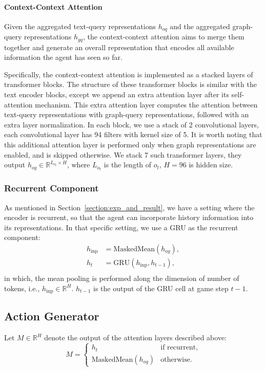 \documentclass[11pt]{article}
\begin{document}
\paragraph{Context-Context Attention}
Given the aggregated text-query representations $h_{oq}$ and the aggregated graph-query representations $h_{gq}$, the context-context attention aims to merge them together and generate an overall representation that encodes all available information the agent has seen so far.

Specifically, the context-context attention is implemented as a stacked layers of transformer blocks.
The structure of these transformer blocks is similar with the text encoder blocks, except we append an extra attention layer after its self-attention mechanism.
This extra attention layer computes the attention between text-query representations with graph-query representations, followed with an extra layer normalization.
In each block, we use a stack of 2 convolutional layers, each convolutional layer has 94 filters with kernel size of 5.
It is worth noting that this additional attention layer is performed only when graph representations are enabled, and is skipped otherwise.
We stack 7 such transformer layers, they output $h_{og} \in \mathbb{R}^{L_{o_t} \times H}$, where $L_{o_t}$ is the length of $o_t$, $H=96$ is hidden size.

\subsubsection{Recurrent Component}
As mentioned in Section~\ref{section:exp_and_result}, we have a setting where the encoder is recurrent, so that the agent can incorporate history information into its representations.
In that specific setting, we use a GRU \citep{cho2014gru} as the recurrent component:
\begin{equation}
\begin{aligned}
    h_{\text{inp}} &= \textrm{MaskedMean}(h_{og}),\\
    h_t &= \mathrm{GRU}(h_{\text{inp}}, h_{t-1}),\\
\end{aligned}
\end{equation}
in which, the mean pooling is performed along the dimension of number of tokens, i.e., $h_{\text{inp}} \in \mathbb{R}^{H}$. $h_{t-1}$ is the output of the GRU cell at game step $t-1$.

\subsection{Action Generator}
Let $M \in \mathbb{R}^{H}$ denote the output of the attention layers described above:
\begin{equation}
    M = 
    \begin{cases}
        h_t  & \text{if recurrent,}\\
        \textrm{MaskedMean}(h_{og})  & \text{otherwise.}
    \end{cases}
\end{equation}
\end{document}
